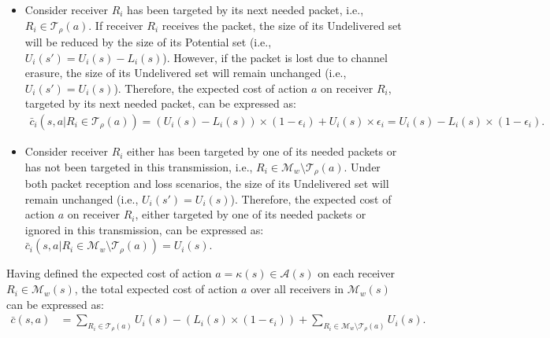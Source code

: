 \documentclass[12pt, peerreview, onecolumn]{IEEEtran}
\begin{document}
\begin{enumerate}
   \begin{itemize}
   \item  Consider  receiver $R_i$   has  been targeted by its next needed packet, i.e., $R_i \in \mathcal{T}_{\rho}(a)$. If receiver $R_i$   receives the packet, the size of its  Undelivered set  will be reduced by the size of its  Potential set  (i.e., $U_i(s') = U_i(s) - L_i(s)$).   However, if the packet is lost  due to channel erasure, the size of its Undelivered set  will remain  unchanged  (i.e., $U_i(s') = U_i(s)$).  Therefore, the expected cost of action $a$ on receiver $R_i$, targeted by its next needed packet, can be expressed as:
         \begin{align}\label{eqn:nextneeded}
         \bar{c}_i(s,a| R_i \in \mathcal{T}_{\rho}(a)) = (U_i (s) - L_i(s)) \times (1- \epsilon_i) + U_i(s) \times \epsilon_i = U_i(s) - L_i(s) \times (1-\epsilon_i).\nonumber
         \end{align}

   \item  Consider receiver $R_i$ either has been targeted by one of its needed packets or has not been targeted in this transmission, i.e., $R_i \in \mathcal{M}_w\setminus\mathcal{T}_{\rho}(a)$. Under both packet reception and loss scenarios,  the size of its Undelivered set will remain unchanged (i.e., $U_i(s') = U_i(s)$). Therefore, the expected cost of action $a $ on receiver $R_i$, either  targeted by one of its  needed packets or ignored in this transmission, can be expressed as: $\bar{c}_i(s,a| R_i \in \mathcal{M}_w \setminus \mathcal{T}_{\rho}(a)) =  U_i(s)$.


\end{itemize}

 Having defined the expected  cost of  action $a = \kappa(s) \in \mathcal{A}(s)$ on each receiver $R_i \in \mathcal M_w(s)$, the total expected cost of   action $a$ over all receivers in $\mathcal M_w(s)$  can be expressed as:
  \begin{align}
  \bar{c}(s,a) &= \sum_{R_i \in \mathcal{T}_{\rho}(a)} U_i(s) - (L_i(s) \times (1-\epsilon_i)) + \sum_{R_i \in \mathcal{M}_w \setminus \mathcal{T}_{\rho}(a)} U_i(s). \end{align}
\end{enumerate}


\vspace{-5mm}
\end{document}
